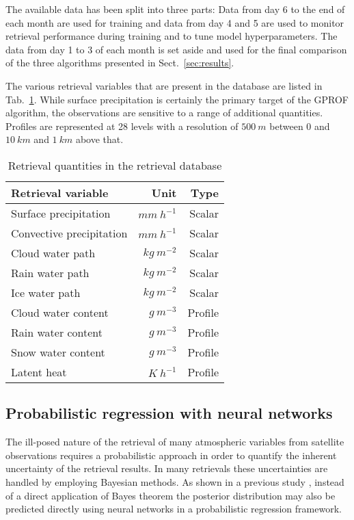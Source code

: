 \documentclass[a4paper,11pt,bibtotoc]{scrartcl}
\begin{document}
The available data has been split into three parts: Data from day 6 to the end
of each month are used for training and data from day 4 and 5 are used to
monitor retrieval performance during training and to tune model hyperparameters.
The data from day 1 to 3 of each month is set aside and used for the final
comparison of the three algorithms presented in Sect.~\ref{sec:results}.

The various retrieval variables that are present in the database are listed
in Tab.~\ref{tab:variables}. While surface precipitation is certainly the
primary target of the GPROF algorithm, the observations are sensitive to
a range of additional quantities. Profiles are represented at 28 levels
with a resolution of $500\ \unit{m}$ between $0$ and $10\ \unit{km}$ and
$1 \ \unit{km}$ above that.

\begin{table}
  \caption{Retrieval quantities in the retrieval database}
  \label{tab:variables}
  \centering
  \begin{tabular}{l|r|r}
    Retrieval variable & Unit & Type\\
    \hline
    \hline

    Surface precipitation & $\unit{mm\ h^{-1}}$ & Scalar \\
    Convective precipitation & $\unit{mm\ h^{-1}}$ & Scalar \\
    Cloud water path & $\unit{kg\ m^{-2}}$ & Scalar \\
    Rain water path & $\unit{kg\ m^{-2}}$ & Scalar \\
    Ice water path & $\unit{kg\ m^{-2}}$ & Scalar \\
    Cloud water content & $\unit{g\ m^{-3}}$ & Profile \\
    Rain water content & $\unit{g\ m^{-3}}$ & Profile \\
    Snow water content & $\unit{g\ m^{-3}}$ & Profile \\
    Latent heat & $\unit{K \ h^{-1}}$ & Profile \\
  \end{tabular}
  \end{table}



\subsection{Probabilistic regression with neural networks}

The ill-posed nature of the retrieval of many atmospheric variables from
satellite observations requires a probabilistic approach in order to quantify
the inherent uncertainty of the retrieval results. In many retrievals these
uncertainties are handled by employing Bayesian methods. As shown in a previous
study \cite{pfreundschuh18}, instead of a direct application of Bayes theorem
the posterior distribution may also be predicted directly using neural networks
in a probabilistic regression framework.
\end{document}
